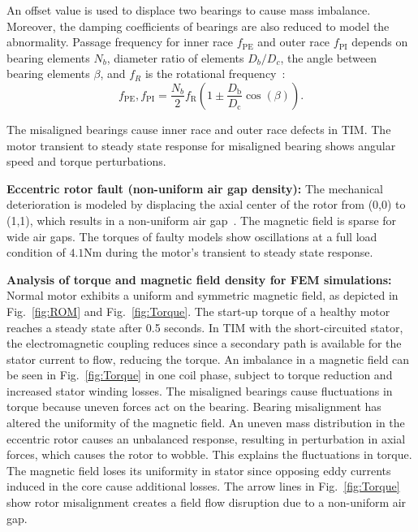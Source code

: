 \documentclass[a4paper,conference]{IEEEtran}
\newcommand{\todo}[1]{\color{red}TODO:\textbf{#1}\color{black}}
\begin{document}
An offset value is used to displace two bearings to cause mass imbalance. Moreover, the damping coefficients of bearings are also reduced to model the abnormality. 
Passage frequency for inner race $f_{\text{PE}}$ and outer race $f_{\text{PI}}$ depends on bearing elements $N_b$, diameter ratio of elements $D_b/D_c$, the angle between bearing elements $\beta$, and $f_R$ is the rotational frequency~\cite{wu2020automatic}:
\begin{equation}
f_{\text{PE}},f_{\text{PI}}  = \frac{N_b}{2}f_{\text{R}}\left(1 \pm \frac{D_{\text{b}}}{D_{\text{c}}}\cos(\beta)\right).
\end{equation}

The misaligned bearings cause inner race and outer race defects in TIM. The motor transient to steady state response for misaligned bearing shows angular speed and torque perturbations. 



\textbf{Eccentric rotor fault (non-uniform air gap density):} The mechanical deterioration is modeled by displacing the axial center of the rotor from (0,0) to (1,1), which results in a non-uniform air gap~\cite{tian2018induction}. The magnetic field is sparse for wide air gaps. The torques of faulty models show oscillations at a full load condition of $4.1$Nm during the motor’s transient to steady state response. %

\textbf{Analysis of torque and magnetic field density for FEM simulations:} Normal motor exhibits a uniform and symmetric magnetic field, as depicted in Fig.~\ref{fig:ROM} and Fig.~\ref{fig:Torque}.  The start-up torque of a healthy motor reaches a steady state after 0.5 seconds. In TIM with the short-circuited stator, the electromagnetic coupling reduces since a secondary path is available for the stator current to flow, reducing the torque. An imbalance in a magnetic field can be seen in Fig.~\ref{fig:Torque} in one coil phase, subject to torque reduction and increased stator winding losses. The misaligned bearings cause fluctuations in torque because uneven forces act on the bearing. Bearing misalignment has altered the uniformity of the magnetic field. An uneven mass distribution in the eccentric rotor causes an unbalanced response, resulting in perturbation in axial forces, which causes the rotor to wobble. This explains the fluctuations in torque. The magnetic field loses its uniformity in stator since opposing eddy currents induced in the core cause additional losses. The arrow lines in Fig.~\ref{fig:Torque} show rotor misalignment creates a field flow disruption due to a non-uniform air gap.
\end{document}
